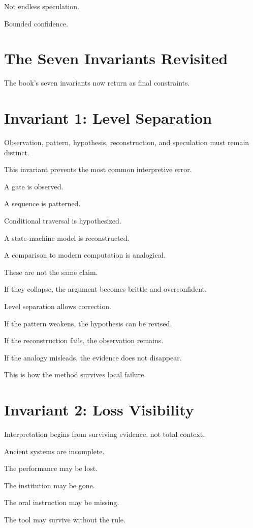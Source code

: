 \documentclass[11pt]{book}
\begin{document}
Not endless speculation.

Bounded confidence.

\section{The Seven Invariants Revisited}

The book's seven invariants now return as final constraints.

\section{Invariant 1: Level Separation}

Observation, pattern, hypothesis, reconstruction, and speculation must remain distinct.

This invariant prevents the most common interpretive error.

A gate is observed.

A sequence is patterned.

Conditional traversal is hypothesized.

A state-machine model is reconstructed.

A comparison to modern computation is analogical.

These are not the same claim.

If they collapse, the argument becomes brittle and overconfident.

Level separation allows correction.

If the pattern weakens, the hypothesis can be revised.

If the reconstruction fails, the observation remains.

If the analogy misleads, the evidence does not disappear.

This is how the method survives local failure.

\section{Invariant 2: Loss Visibility}

Interpretation begins from surviving evidence, not total context.

Ancient systems are incomplete.

The performance may be lost.

The institution may be gone.

The oral instruction may be missing.

The tool may survive without the rule.
\end{document}
